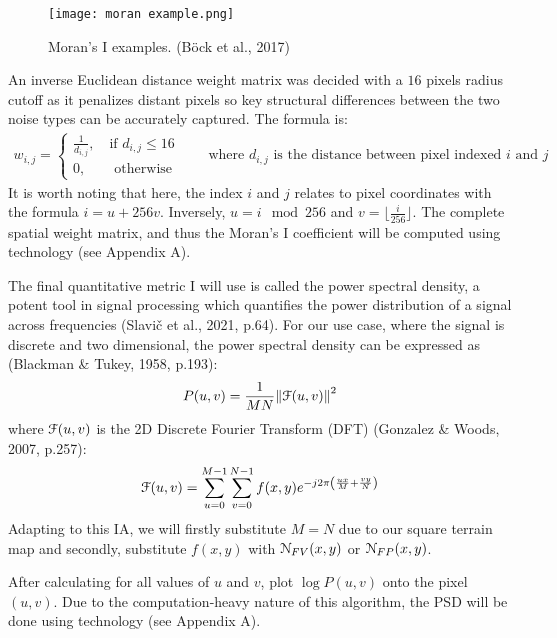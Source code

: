 \begin{figure}[H]
    \centering
    \texttt{[image: moran example.png]}
    \caption{Moran's I examples. (Böck et al., 2017)}
    \label{fig:moran_ex}
\end{figure}

An inverse Euclidean distance weight matrix was decided with a $16$ pixels radius cutoff as it penalizes distant pixels so key structural differences 
between the two noise types can be accurately captured. The formula is:
\begin{align*}
    w_{i,j}=
    \begin{cases}
        \frac{1}{d_{i,j}}, \quad\text{if } d_{i,j}\le16\\
        0, \qquad\text{otherwise}
    \end{cases}
    \qquad\text{where } d_{i,j} \text{ is the distance between pixel indexed } i \text{ and } j
\end{align*}
It is worth noting that here, the index $i$ and $j$ relates to pixel coordinates with the formula $i=u+256v$. Inversely, $u=i\mod 256$ and 
$v=\lfloor\frac{i}{256}\rfloor$. The complete spatial weight matrix, and thus the Moran's I coefficient will be computed using technology 
(see Appendix A). 

The final quantitative metric I will use is called the power spectral density, a potent tool in signal processing which quantifies the power 
distribution of a signal across frequencies (Slavič et al., 2021, p.64). For our use case, where the signal is discrete and two dimensional, 
the power spectral density can be expressed as (Blackman \& Tukey, 1958, p.193):
\[P(u,v)=\frac{1}{MN}{\|\EuScript{F}(u,v)\|}^2\]
where $\EuScript{F}(u,v)$ is the 2D Discrete Fourier Transform (DFT) (Gonzalez \& Woods, 2007, p.257):
\[\EuScript{F}(u,v)=\sum_{u=0}^{M-1}\sum_{v=0}^{N-1}f(x,y)e^{-j2\pi\left(\frac{ux}{M}+\frac{vy}{N}\right)}\]
Adapting to this IA, we will firstly substitute $M=N$ due to our square terrain map and secondly, substitute $f(x,y)$ with $\EuScript{N}_{FV}(x,y)$
or $\EuScript{N}_{FP}(x,y)$.

After calculating for all values of $u$ and $v$, plot $\log P(u,v)$ onto the pixel $(u,v)$. Due to the computation-heavy nature of this algorithm, 
the PSD will be done using technology (see Appendix A).